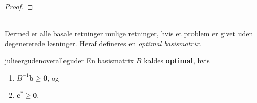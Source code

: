 {\begin{proof}
\end{proof}
\\
%
Dermed er alle basale retninger mulige retninger, hvis et problem er givet uden degenererede løsninger. 
Heraf defineres en \textit{optimal basismatrix}.}
%
\begin{defn}{}{julieergudenoveralleguder}
En basismatrix $B$ kaldes \textbf{optimal}, hvis
%
\begin{enumerate}[label = (\alph*)]
\item $B^{-1} \mathbf{b} \geq \mathbf{0}$, og
\item $\mathbf{c}^* \geq \mathbf{0}$.
\end{enumerate}
%
\end{defn}
\noindent